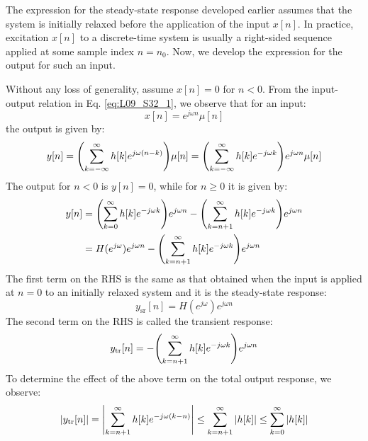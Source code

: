 \documentclass[../../main/main.tex]{subfiles}
\begin{document}
The expression for the steady-state response developed earlier assumes that the system is initially relaxed before the application of the input \( x[n] \). In practice, excitation \( x[n] \) to a discrete-time system is usually a right-sided sequence applied at some sample index \( n = n_{0} \). Now, we develop the expression for the output for such an input.

Without any loss of generality, assume \( x[n] = 0 \) for \( n < 0 \). From the input-output relation in Eq. \ref{eq:L09_S32_1}, we observe that for an input:
\begin{equation}
    x[n]
    =
    e^{j \omega n} \mu[n]
    \label{eq:L09_S49_2}
\end{equation}
the output is given by:
\begin{equation}
    y[n]
    =
    \qty(\sum_{k=-\infty}^{\infty} h[k] e^{j \omega (n-k)}) \mu[n]
    =
    \qty(\sum_{k=-\infty}^{\infty} h[k] e^{-j \omega k}) e^{j \omega n} \mu[n]
    \label{eq:L09_S49_3}
\end{equation}
The output for \( n < 0 \) is \( y[n] = 0 \), while for \( n \ge 0 \) it is given by:
\begin{align}
    y[n]
    &=
        \qty(\sum_{k=0}^{\infty} h[k] e^{-j \omega k}) e^{j \omega n} - \qty(\sum_{k=n+1}^{\infty} h[k] e^{-j \omega k}) e^{j \omega n} \nonumber   \\
    &=
        H(e^{j \omega}) e^{j \omega n} - \qty(\sum_{k=n+1}^{\infty} h[k] e^{-j \omega k}) e^{j \omega n}
\end{align}
The first term on the RHS is the same as that obtained when the input is applied at \( n = 0 \) to an initially relaxed system and it is the steady-state response:
\begin{equation}
    y_{\mathrm{sr}}[n]
    =
    H(e^{j \omega}) e^{j \omega n}
    \label{eq:L09_S51_2}
\end{equation}
The second term on the RHS is called the transient response:
\begin{equation}
    y_{\mathrm{tr}}[n]
    =
    - \qty(\sum_{k=n+1}^{\infty} h[k] e^{-j \omega k}) e^{j \omega n}
    \label{eq:L09_S52_1}
\end{equation}
To determine the effect of the above term on the total output response, we observe:
\begin{equation}
    \abs{y_{\mathrm{tr}}[n]}
    =
    \abs{\sum_{k=n+1}^{\infty} h[k] e^{-j \omega (k-n)}}
    \le
    \sum_{k=n+1}^{\infty} \abs{h[k]}
    \le
    \sum_{k=0}^{\infty} \abs{h[k]}
    \label{eq:L09_S52_2}
\end{equation}
\end{document}
